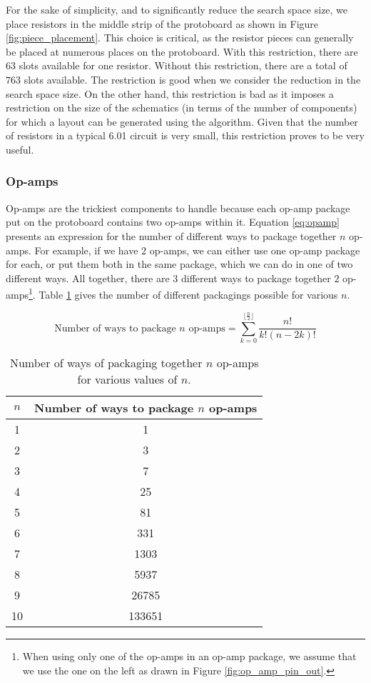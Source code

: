 For the sake of simplicity, and to significantly reduce the search space size, we
place resistors in the middle strip of the protoboard as shown in Figure
\ref{fig:piece_placement}. This choice is critical,
as the resistor pieces can generally be placed at numerous places on the
protoboard.
With this restriction, there are $63$ slots available for one resistor. Without
this restriction, there are a total of $763$ slots available. The restriction is
good when we consider the reduction in the search space size. On the other hand,
this restriction is bad as it imposes a restriction on the size of the
schematics (in terms of the number of components) for which a layout can be
generated using the algorithm.
Given that the number
of resistors in a typical 6.01 circuit is very
small, this restriction proves to be very useful.

\subsubsection{Op-amps}

Op-amps are the trickiest components to handle because each op-amp package put
on the protoboard contains two op-amps within it. Equation
\ref{eq:opamp} presents an expression for the number of
different ways to package together $n$ op-amps. For example, if we have $2$
op-amps, we can either use one op-amp package for each, or put them both in the
same package, which we can do in one of two different ways. All together, there
are $3$ different ways to package together $2$ op-amps\footnote{When using only
one of the op-amps in an op-amp package, we assume that we use the one on the
left as drawn in Figure \ref{fig:op_amp_pin_out}.}.
Table \ref{tb:opamp} gives the number of different packagings possible for
various $n$.

\begin{equation}
\text{Number of ways to package $n$ op-amps} =
\sum\limits_{k=0}^{\lfloor\frac{n}{2}\rfloor}{\frac{n!}{k!(n - 2k)!}}
\label{eq:opamp}
\end{equation}

\begin{table}
\begin{center}
\begin{singlespace}
\begin{tabular}{c | c}
$n$ & Number of ways to package $n$ op-amps \\
\hline
\hline
1 & 1 \\
2 & 3 \\
3 & 7 \\
4 & 25 \\
5 & 81 \\
6 & 331 \\
7 & 1303 \\
8 & 5937 \\
9 & 26785 \\
10 & 133651
\end{tabular}
\end{singlespace}
\end{center}
\caption[Op-amp packaging possibilities]{Number of ways of packaging together
$n$ op-amps for various values of $n$.}
\label{tb:opamp}
\end{table}

